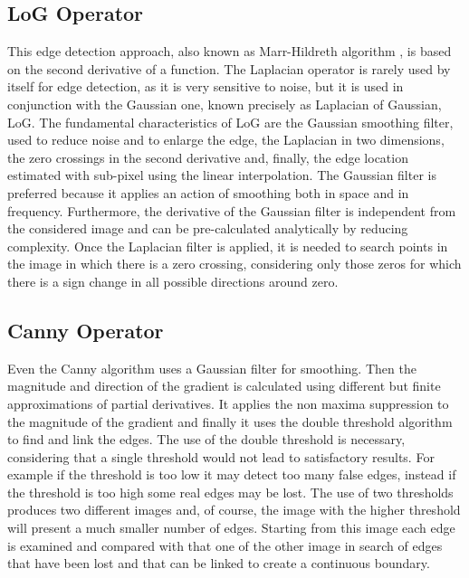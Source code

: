 \documentclass[final,a4paper,12pt,english]{UnicaPhdThesis3}
\begin{document}
	\subsection{LoG Operator} %
	This edge detection approach, also known as Marr-Hildreth algorithm \cite{Marr}, is based on the second derivative of a function. The Laplacian operator is rarely used by itself for edge detection, as it is very sensitive to noise, but it is used in conjunction with the Gaussian one, known precisely as Laplacian of Gaussian, LoG. The fundamental characteristics of LoG are the Gaussian smoothing filter, used to reduce noise and to enlarge the edge, the Laplacian in two dimensions, the zero crossings in the second derivative and, finally, the edge location estimated with sub-pixel using the linear interpolation. The Gaussian filter is preferred because it applies an action of smoothing both in space and in frequency. Furthermore, the derivative of the Gaussian filter is independent from the considered image and can be pre-calculated analytically by reducing complexity. Once the Laplacian filter is applied, it is needed to search points in the image in which there is a zero crossing, considering only those zeros for which there is a sign change in all possible directions around zero.
	
	\subsection{Canny Operator} %
	Even the Canny algorithm \cite{Canny} uses a Gaussian filter for smoothing. Then the magnitude and direction of the gradient is calculated using different but finite approximations of partial derivatives. It applies the non maxima suppression to the magnitude of the gradient and finally it uses the double threshold algorithm to find and link the edges. The use of the double threshold is necessary, considering that a single threshold would not lead to satisfactory results. For example if the threshold is too low it may detect too many false edges, instead if the threshold is too high some real edges may be lost. The use of two thresholds produces two different images and, of course, the image with the higher threshold will present a much smaller number of edges. Starting from this image each edge is examined and compared with that one of the other image in search of edges that have been lost and that can be linked to create a continuous boundary.
	
\end{document}

